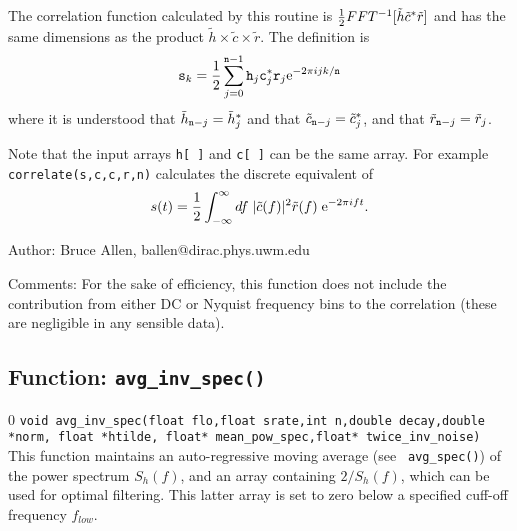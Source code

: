 The correlation function calculated by this routine is ${1 \over 2} FFT^{-1}[\tilde
h \tilde c^* \tilde r]$ and has the same dimensions as the product
$\tilde h \times \tilde c \times \tilde r$.  The definition is
\begin{equation}
{\tt s}_k = {1 \over 2} \sum_{j=0}^{{\tt n}-1} {\tt h}_j {\tt c}^*_j {\tt r}_j
{\rm e}^{- 2 \pi i j k/{\tt n}}
\end{equation}
where it is understood that ${\tilde h}_{{\tt n}-j} = \tilde h^*_j$ and
that ${\tilde c}_{{\tt n}-j} = \tilde c^*_j$, and that
${\tilde r}_{{\tt n}-j} = \tilde r_j$. 

Note that the input arrays
{\tt h[ ]} and {\tt c[ ]} can be the same array.  For example {\tt
correlate(s,c,c,r,n)} calculates the discrete equivalent of
\begin{equation}
s(t) = {1 \over 2} \int_{-\infty}^\infty df \; { |\tilde c (f) |^2 \tilde r (f) }
 \; {\rm e}^{- 2 \pi i f t}.
\end{equation}

\begin{description}
\item{Author:}
Bruce Allen, ballen@dirac.phys.uwm.edu
\item{Comments:}
For the sake of efficiency, this function does not include the
contribution from either DC or Nyquist frequency bins to the
correlation (these are negligible in any sensible data).
\end{description}
\clearpage

\subsection{Function: {\tt avg\_inv\_spec()}}
\label{ss:avg_inv_spec}
\setcounter{equation}0
{\tt  void avg\_inv\_spec(float flo,float srate,int n,double decay,double *norm,
                  float *htilde, float* mean\_pow\_spec,float* twice\_inv\_noise)}\\
This function maintains an auto-regressive moving average (see {\tt
avg\_spec()}) of the power spectrum $S_h(f)$, and an array containing
$2/S_h(f)$, which can be used for optimal filtering.  This latter array
is set to zero below a specified cuff-off frequency $f_{low}$.


